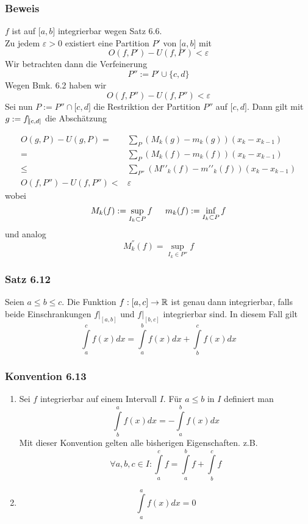 \subsubsection*{Beweis}
$f$ ist auf $\lbrack a,b\rbrack$ integrierbar wegen Satz 6.6.\\
Zu jedem $\varepsilon>0$ existiert eine Partition $P'$ von $\lbrack a,b\rbrack$ mit \[O(f,P')-U(f,P')<\varepsilon\]
Wir betrachten dann die Verfeinerung \[P'':=P'\cup\{ c,d\}\]
Wegen Bmk. 6.2 haben wir \[O(f,P'')-U(f,P'')<\varepsilon\]
Sei nun $P:=P''\cap \lbrack c,d\rbrack$ die Restriktion der Partition $P''$ auf $\lbrack c,d\rbrack$. Dann gilt mit $g:=f\vline _{\left[ c,d\right] }$ die Abschätzung

\begin{align*}
O(g,P) - U(g,P) =&\sum\limits_P {({M_k}(g) - {m_k}(g))({x_k} - {x_{k - 1}})} \\
=&\sum\limits_P {({M_k}(f) - {m_k}(f))({x_k} - {x_{k - 1}})} \\
\le&\sum\limits_{P''} {(M'{'_k}(f) - m'{'_k}(f))({x_k} - {x_{k - 1}})} \\
O(f,P'')-U(f,P'')<& \varepsilon
\end{align*}
wobei
\[{M_k}(f): = \mathop {\sup }\limits_{{I_k} \subset P} f\text{\indent}{m_k}(f): = \mathop {\inf }\limits_{{I_k} \subset P} f\]
und analog
\[M^{''}_{k}\left( f\right) =\sup _{I_k\in P''}f\]

\subsubsection*{Satz 6.12}
Seien $a\leq b\leq c$. Die Funktion $f:\lbrack a,c\rbrack\to\mathbb{R}$ ist genau dann integrierbar, falls beide Einschrankungen ${\left. f \right|_{[a,b]}}$ und ${\left. f \right|_{[b,c]}}$ integrierbar sind. In diesem Fall gilt \[\int\limits_a^c {f(x)dx = \int\limits_a^b {f(x)dx + \int\limits_b^c {f(x)dx} } } \]
\subsubsection*{Konvention 6.13}
\begin{enumerate}[\indent 1)]
\item Sei $f$ integrierbar auf einem Intervall $I$. Für $a\leq b$ in $I$ definiert man \[\int\limits_b^a {f(x)dx =  - \int\limits_a^b {f(x)dx} } \]
Mit dieser Konvention gelten alle bisherigen Eigenschaften. z.B. \[\forall a,b,c \in I:\int\limits_a^c f  = \int\limits_a^b f  + \int\limits_b^c f \]
\item \[\int\limits_a^a {f(x)dx = 0} \]
\end{enumerate}
